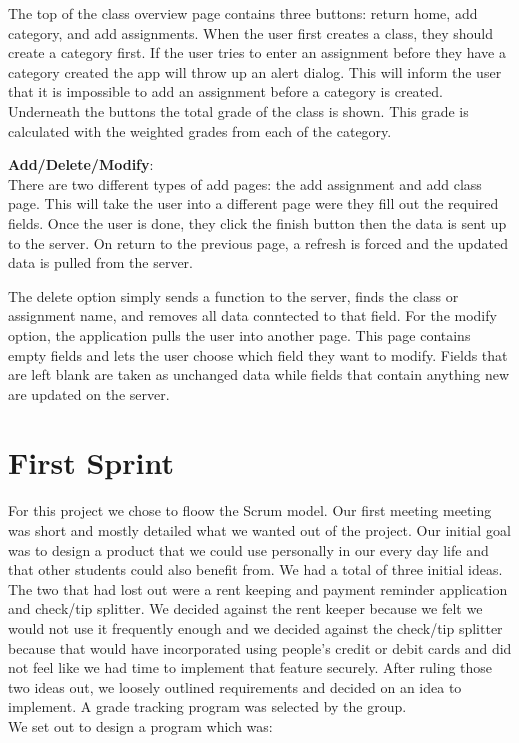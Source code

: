\documentclass[a4paper]{article} %
\begin{document}
The top of the class overview page contains three buttons: return home, add category, and add assignments. When the user first creates a class, they should create a category first. If the user tries to enter an assignment before they have a category created the app will throw up an alert dialog. This will inform the user that it is impossible to add an assignment before a category is created. Underneath the buttons the total grade of the class is shown. This grade is calculated with the weighted grades from each of the category.


\textbf{Add/Delete/Modify}:\\
There are two different types of add pages: the add assignment and add class page. This will take the user into a different page were they fill out the required fields. Once the user is done, they click the finish button then the data is sent up to the server. On return to the previous page, a refresh is forced and the updated data is pulled from the server.

The delete option simply sends a function to the server, finds the class or assignment name, and removes all data conntected to that field. For the modify option, the application pulls the user into another page. This page contains empty fields and lets the user choose which field they want to modify. Fields that are left blank are taken as unchanged data while fields that contain anything new are updated on the server.


\section{First Sprint}

For this project we chose to floow the Scrum model. Our first meeting meeting was short and mostly detailed what we wanted out of the project. Our initial goal was to design a product that we could use personally in our every day life and that other students could also benefit from. We had a total of three initial ideas. The two that had lost out were a rent keeping and payment reminder application and check/tip splitter. We decided against the rent keeper because we felt we would not use it frequently enough and we decided against the check/tip splitter because that would have incorporated using people's credit or debit cards and did not feel like we had time to implement that feature securely. After ruling those two ideas out, we loosely outlined requirements and decided on an idea to implement. A grade tracking program was selected by the group. 
\\
We set out to design a program which was:
\end{document}
